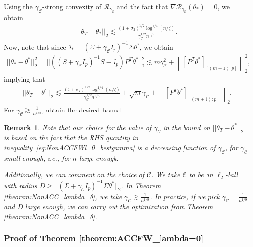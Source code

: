 \documentclass{article}
\newtheorem{remark}{\textbf{Remark}}
\begin{document}
Using the $\gamma_{\mathcal{C}}$-strong convexity of $\mathcal{R}_{\gamma_{\mathcal{C}}}$ and the fact that $\nabla\mathcal{R}_{\gamma_{\mathcal{C}}}(\theta_{*}) = 0$, we obtain
\begin{align*}
||\theta_T - \theta_{*}||_2 \lesssim \frac{(1 + \sigma_2)^{1/2}\log^{1/4}(n/\zeta)}{\gamma_{\mathcal{C}}^{1/2}n^{1/6}}.
\end{align*}
Now, note that since $\theta_{*} = (\Sigma + \gamma_{\mathcal{C}}I_p)^{-1}\Sigma\theta^*$, we obtain
\begin{align*}
||\theta_{*} - \theta^*||_2^2 = ||((S + \gamma_{\mathcal{C}}I_p)^{-1}S - I_p)P^T\theta^*||_2^2 \lesssim m\gamma_{\mathcal{C}}^2 + \left\|[P^T\theta^*]_{[(m+1):p]}\right\|_2^2,
\end{align*}
implying that
\begin{align}
\label{eq:NonACCFWl=0_bestgamma}
||\theta_T - \theta^*||_2 \lesssim \frac{(1 + \sigma_2)^{1/2}\log^{1/4}(n/\zeta)}{\gamma_{\mathcal{C}}^{1/2}n^{1/6}} + \sqrt{m}\gamma_{\mathcal{C}} + \left\|[P^T\theta^*]_{[(m+1):p]}\right\|_2.
\end{align}
For $\gamma_{\mathcal{C}} \gtrsim \frac{1}{n^{1/9}}$, obtain the desired bound.

\begin{remark}
Note that our choice for the value of $\gamma_{\mathcal{C}}$ in the bound on $||\theta_T - \theta^*||_2$ is based on the fact that the RHS quantity in inequality~\eqref{eq:NonACCFWl=0_bestgamma} is a decreasing function of $\gamma_{\mathcal{C}}$, for $\gamma_{\mathcal{C}}$ small enough, i.e., for $n$ large enough.

Additionally, we can comment on the choice of $\mathcal{C}$. We take $\mathcal{C}$ to be an $\ell_2$-ball with radius $D \geq ||(\Sigma + \gamma_{\mathcal{C}}I_p)^{-1}\Sigma\theta^*||_2$. In Theorem \ref{theorem:NonACC_lambda=0}, we take $\gamma_{\mathcal{C}} \gtrsim \frac{1}{n^{1/9}}$. In practice, if we pick $\gamma_{\mathcal{C}} = \frac{1}{n^{1/9}}$ and $D$ large enough, we can carry out the optimization from Theorem \ref{theorem:NonACC_lambda=0}.
\end{remark}


\subsubsection{Proof of Theorem \ref{theorem:ACCFW_lambda=0}}
\label{AppThmACCFW}
\end{document}

